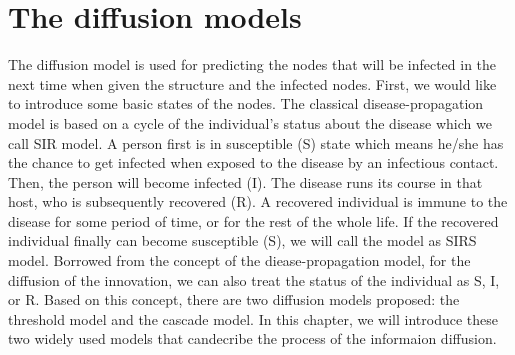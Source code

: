 \chapter{The diffusion models}
\label{chap:model}

The diffusion model is used for predicting the nodes that will be infected in the next time when given the structure and the infected nodes. First, we would like to introduce some basic states of the nodes. The classical disease-propagation model is based on a cycle of the individual’s status about the disease which we call SIR model. A person first is in susceptible (S) state which means he/she has the
chance to get infected when exposed to the disease by an infectious
contact. Then, the person will become infected (I). The disease runs
its course in that host, who is subsequently recovered (R).  A
recovered individual is immune to the disease for some period of time,
or for the rest of the whole life.  If the recovered individual
finally can become susceptible (S), we will call the model as SIRS model. 
Borrowed from the concept of the diease-propagation model, for the diffusion of the innovation, we can also treat the status of the individual as S, I, or R. Based on this concept, there are two diffusion models proposed: the threshold model and the cascade model. In this chapter, we will introduce these two widely used models that candecribe the process of the informaion diffusion.

